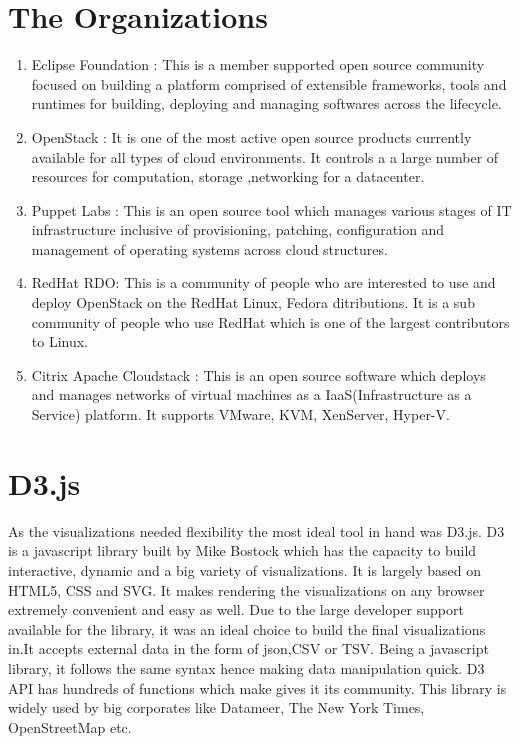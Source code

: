 \documentclass[seploa]{beavtex}
\begin{document}
\section{The Organizations}
\begin{enumerate}
\item Eclipse Foundation :
This is a member supported open source community focused on building a platform comprised of extensible frameworks, tools and runtimes for building, deploying and managing softwares across the lifecycle.
\item OpenStack :
It is one of the most active open source products currently available for all types of cloud environments. It controls a a large number of resources for computation, storage ,networking for a datacenter.
\item Puppet Labs :
This is an open source tool which manages various stages of IT infrastructure inclusive of provisioning, patching, configuration and management of operating systems across cloud structures.
\item RedHat RDO:
This is a community of people who are interested to use and deploy OpenStack on the RedHat Linux, Fedora ditributions. It is a sub community of people who use RedHat which is one of the largest contributors to Linux.
\item Citrix Apache Cloudstack :
This is an open source software which deploys and manages networks of virtual machines as a IaaS(Infrastructure as a Service) platform. It supports VMware, KVM, XenServer, Hyper-V.
\end{enumerate}

\section{D3.js}
As the visualizations needed flexibility the most ideal tool in hand was D3.js. D3 is a javascript library built by Mike Bostock which has the capacity to build interactive, dynamic and a big variety of visualizations. It is largely based on HTML5, CSS and SVG. It makes rendering the visualizations on any browser extremely convenient and easy as well. Due to the large developer support available for the library, it was an ideal choice to build the final visualizations in.It accepts external data in the form of json,CSV or TSV. Being a javascript library, it follows the same syntax hence making data manipulation quick. D3 API has hundreds of functions which make gives it its community. This library is widely used by big corporates like Datameer, The New York Times, OpenStreetMap etc.
\end{document}

